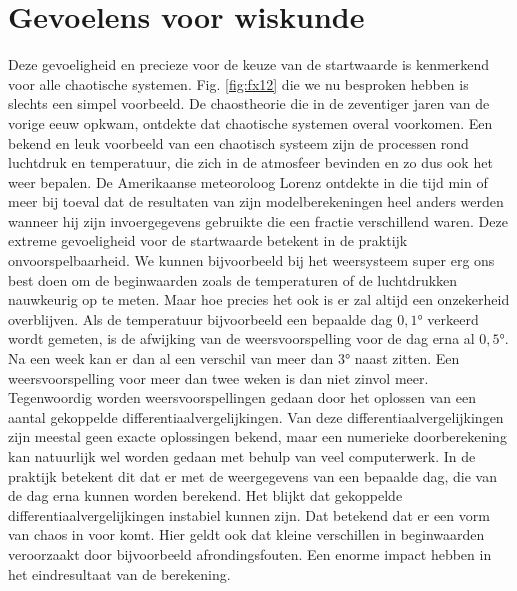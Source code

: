 \documentclass[11pt,fleqn]{book} %
\begin{document}
\section{Gevoelens voor wiskunde}
Deze gevoeligheid en precieze voor de keuze van de startwaarde is kenmerkend voor alle chaotische systemen. Fig. \ref{fig:fx12} die we nu besproken hebben is slechts een simpel voorbeeld. De chaostheorie die in de zeventiger jaren van de vorige eeuw opkwam, ontdekte dat chaotische systemen overal voorkomen. Een bekend en leuk voorbeeld van een chaotisch systeem zijn de processen rond luchtdruk en temperatuur, die zich in de atmosfeer bevinden en zo dus ook het weer bepalen. De Amerikaanse meteoroloog Lorenz ontdekte in die tijd min of meer bij toeval dat de resultaten van zijn modelberekeningen heel anders werden wanneer hij  zijn invoergegevens gebruikte die een fractie verschillend waren. Deze extreme gevoeligheid voor de startwaarde betekent in de praktijk onvoorspelbaarheid. We kunnen bijvoorbeeld bij het weersysteem super erg ons best doen om de beginwaarden zoals de temperaturen of de luchtdrukken nauwkeurig op te meten. Maar hoe precies het ook is er zal altijd een onzekerheid overblijven. Als de temperatuur bijvoorbeeld een bepaalde dag $0,1\si{\degree}$ verkeerd wordt gemeten, is de afwijking van de weersvoorspelling voor de dag erna al $0,5\si{\degree}$. Na een week kan er dan al een verschil van meer dan $3\si{\degree}$ naast zitten. Een weersvoorspelling voor meer dan twee weken is dan niet zinvol meer. Tegenwoordig worden weersvoorspellingen gedaan door het oplossen van een aantal gekoppelde differentiaalvergelijkingen. Van deze differentiaalvergelijkingen zijn meestal geen exacte oplossingen bekend, maar een numerieke doorberekening kan natuurlijk wel worden gedaan met behulp van veel computerwerk. In de praktijk betekent dit dat er met de weergegevens van een bepaalde dag, die van de dag erna kunnen worden berekend. Het blijkt dat gekoppelde differentiaalvergelijkingen instabiel kunnen zijn. Dat betekend dat er een vorm van chaos in voor komt. Hier geldt ook dat kleine verschillen in beginwaarden veroorzaakt door bijvoorbeeld afrondingsfouten. Een enorme impact hebben in het eindresultaat van de berekening.
\end{document}
